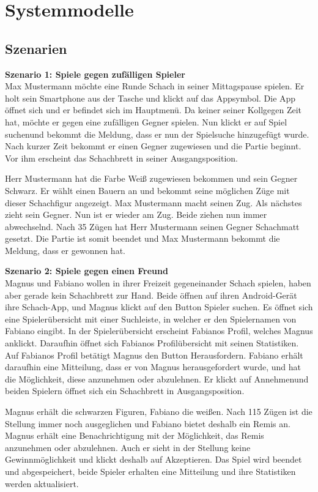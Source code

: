 \documentclass[parskip=full]{scrartcl}
\begin{document}
\section{Systemmodelle}
\subsection{Szenarien}
\textbf{Szenario 1: \glqq Spiele gegen zufälligen Spieler\grqq} \\
Max Mustermann möchte eine Runde Schach in seiner Mittagspause spielen. Er holt sein Smartphone aus der Tasche und klickt auf das Appsymbol.
Die App öffnet sich und er befindet sich im Hauptmenü. Da keiner seiner Kollgegen Zeit hat, möchte er gegen eine zufälligen Gegner spielen. Nun klickt er auf \glqq Spiel suchen\grqq und bekommt die Meldung, dass er nun der Spielsuche hinzugefügt wurde.
Nach kurzer Zeit bekommt er einen Gegner zugewiesen und die Partie beginnt. Vor ihm erscheint das \gls{Schachbrett} in seiner \gls{Ausgangsposition}.

Herr Mustermann hat die Farbe Weiß zugewiesen bekommen und sein Gegner Schwarz. Er wählt einen Bauern an und bekommt seine möglichen Züge mit dieser \gls{Schachfigur} angezeigt.
Max Mustermann macht seinen Zug. Als nächstes zieht sein Gegner. Nun ist er wieder am Zug. Beide ziehen nun immer abwechselnd. Nach 35 Zügen hat Herr Mustermann
seinen Gegner \gls{Schachmatt} gesetzt. Die Partie ist somit beendet und Max Mustermann bekommt die Meldung, dass er gewonnen hat.

\textbf{Szenario 2: \glqq Spiele gegen einen Freund\grqq} \\
Magnus und Fabiano wollen in ihrer Freizeit gegeneinander Schach spielen, haben aber gerade kein Schachbrett zur Hand. Beide öffnen auf ihren \gls{Android}-Gerät ihre Schach-App, und Magnus klickt auf den Button \glqq Spieler suchen\grqq. Es öffnet sich eine Spielerübersicht mit einer Suchleiste, in welcher er den Spielernamen von Fabiano eingibt. In der Spielerübersicht erscheint Fabianos Profil, welches Magnus anklickt. Daraufhin öffnet sich Fabianos Profilübersicht mit seinen Statistiken. Auf Fabianos Profil betätigt Magnus den Button \glqq Herausfordern\grqq. Fabiano erhält daraufhin eine Mitteilung, dass er von Magnus herausgefordert wurde, und hat die Möglichkeit, diese anzunehmen oder abzulehnen. Er klickt auf \glqq Annehmen\grqq und beiden Spielern öffnet sich ein \gls{Schachbrett} in \gls{Ausgangsposition}.

Magnus erhält die schwarzen Figuren, Fabiano die weißen. Nach 115 Zügen ist die Stellung immer noch ausgeglichen und Fabiano bietet deshalb ein \gls{Remis} an. Magnus erhält eine Benachrichtigung mit der Möglichkeit, das \gls{Remis} anzunehmen oder abzulehnen. Auch er sieht in der Stellung keine Gewinnmöglichkeit und klickt deshalb auf \glqq Akzeptieren\grqq. Das Spiel wird beendet und abgespeichert, beide Spieler erhalten eine Mitteilung und ihre Statistiken werden aktualisiert.
\end{document}
